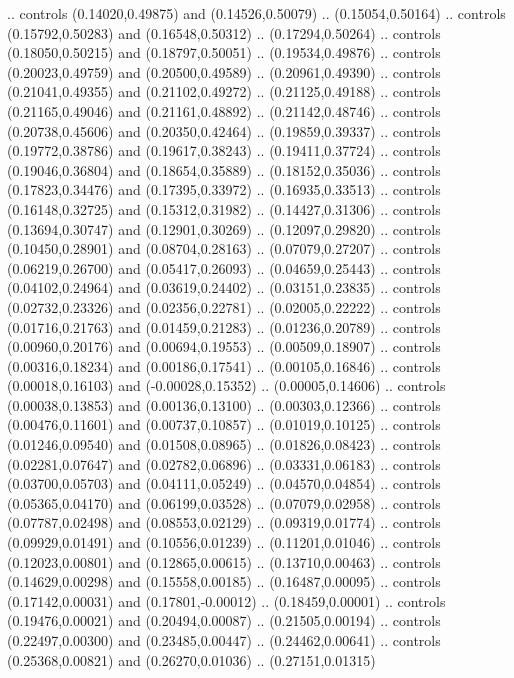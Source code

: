     .. controls (0.14020,0.49875) and (0.14526,0.50079) .. (0.15054,0.50164)
    .. controls (0.15792,0.50283) and (0.16548,0.50312) .. (0.17294,0.50264)
    .. controls (0.18050,0.50215) and (0.18797,0.50051) .. (0.19534,0.49876)
    .. controls (0.20023,0.49759) and (0.20500,0.49589) .. (0.20961,0.49390)
    .. controls (0.21041,0.49355) and (0.21102,0.49272) .. (0.21125,0.49188)
    .. controls (0.21165,0.49046) and (0.21161,0.48892) .. (0.21142,0.48746)
    .. controls (0.20738,0.45606) and (0.20350,0.42464) .. (0.19859,0.39337)
    .. controls (0.19772,0.38786) and (0.19617,0.38243) .. (0.19411,0.37724)
    .. controls (0.19046,0.36804) and (0.18654,0.35889) .. (0.18152,0.35036)
    .. controls (0.17823,0.34476) and (0.17395,0.33972) .. (0.16935,0.33513)
    .. controls (0.16148,0.32725) and (0.15312,0.31982) .. (0.14427,0.31306)
    .. controls (0.13694,0.30747) and (0.12901,0.30269) .. (0.12097,0.29820)
    .. controls (0.10450,0.28901) and (0.08704,0.28163) .. (0.07079,0.27207)
    .. controls (0.06219,0.26700) and (0.05417,0.26093) .. (0.04659,0.25443)
    .. controls (0.04102,0.24964) and (0.03619,0.24402) .. (0.03151,0.23835)
    .. controls (0.02732,0.23326) and (0.02356,0.22781) .. (0.02005,0.22222)
    .. controls (0.01716,0.21763) and (0.01459,0.21283) .. (0.01236,0.20789)
    .. controls (0.00960,0.20176) and (0.00694,0.19553) .. (0.00509,0.18907)
    .. controls (0.00316,0.18234) and (0.00186,0.17541) .. (0.00105,0.16846)
    .. controls (0.00018,0.16103) and (-0.00028,0.15352) .. (0.00005,0.14606)
    .. controls (0.00038,0.13853) and (0.00136,0.13100) .. (0.00303,0.12366)
    .. controls (0.00476,0.11601) and (0.00737,0.10857) .. (0.01019,0.10125)
    .. controls (0.01246,0.09540) and (0.01508,0.08965) .. (0.01826,0.08423)
    .. controls (0.02281,0.07647) and (0.02782,0.06896) .. (0.03331,0.06183)
    .. controls (0.03700,0.05703) and (0.04111,0.05249) .. (0.04570,0.04854)
    .. controls (0.05365,0.04170) and (0.06199,0.03528) .. (0.07079,0.02958)
    .. controls (0.07787,0.02498) and (0.08553,0.02129) .. (0.09319,0.01774)
    .. controls (0.09929,0.01491) and (0.10556,0.01239) .. (0.11201,0.01046)
    .. controls (0.12023,0.00801) and (0.12865,0.00615) .. (0.13710,0.00463)
    .. controls (0.14629,0.00298) and (0.15558,0.00185) .. (0.16487,0.00095)
    .. controls (0.17142,0.00031) and (0.17801,-0.00012) .. (0.18459,0.00001)
    .. controls (0.19476,0.00021) and (0.20494,0.00087) .. (0.21505,0.00194)
    .. controls (0.22497,0.00300) and (0.23485,0.00447) .. (0.24462,0.00641)
    .. controls (0.25368,0.00821) and (0.26270,0.01036) .. (0.27151,0.01315)
